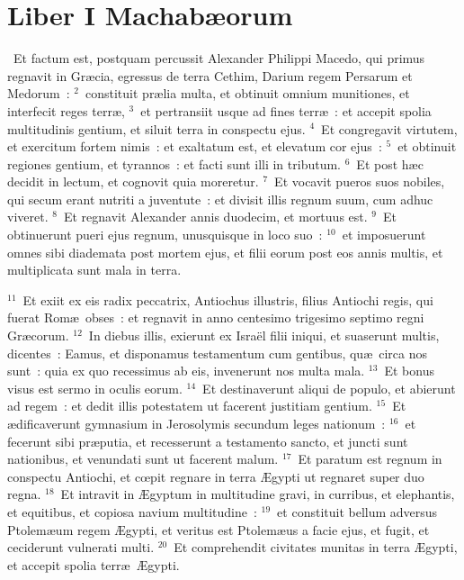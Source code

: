 {\centering \section*{Liber I Machabæorum}}\thispagestyle{empty}

~\lettrine[lines=10,image=true,loversize=0.05,lraise=-0.03]{E}{}t factum est, postquam percussit Alexander Philippi Macedo, qui primus regnavit in Gr\ae cia, egressus de terra Cethim, Darium regem Persarum et Medorum~:
${}^{2}$~constituit pr\ae lia multa, et obtinuit omnium munitiones, et interfecit reges terr\ae ,
${}^{3}$~et pertransiit usque ad fines terr\ae~: et accepit spolia multitudinis gentium, et siluit terra in conspectu ejus.
${}^{4}$~Et congregavit virtutem, et exercitum fortem nimis~: et exaltatum est, et elevatum cor ejus~:
${}^{5}$~et obtinuit regiones gentium, et tyrannos~: et facti sunt illi in tributum.
${}^{6}$~Et post h\ae c decidit in lectum, et cognovit quia moreretur.
${}^{7}$~Et vocavit pueros suos nobiles, qui secum erant nutriti a juventute~: et divisit illis regnum suum, cum adhuc viveret.
${}^{8}$~Et regnavit Alexander annis duodecim, et mortuus est.
${}^{9}$~Et obtinuerunt pueri ejus regnum, unusquisque in loco suo~:
${}^{10}$~et imposuerunt omnes sibi diademata post mortem ejus, et filii eorum post eos annis multis, et multiplicata sunt mala in terra.


${}^{11}$~Et exiit ex eis radix peccatrix, Antiochus illustris, filius Antiochi regis, qui fuerat Rom\ae\ obses~: et regnavit in anno centesimo trigesimo septimo regni Gr\ae corum.
${}^{12}$~In diebus illis, exierunt ex Isra\"el filii iniqui, et suaserunt multis, dicentes~: Eamus, et disponamus testamentum cum gentibus, qu\ae\ circa nos sunt~: quia ex quo recessimus ab eis, invenerunt nos multa mala.
${}^{13}$~Et bonus visus est sermo in oculis eorum.
${}^{14}$~Et destinaverunt aliqui de populo, et abierunt ad regem~: et dedit illis potestatem ut facerent justitiam gentium.
${}^{15}$~Et \ae dificaverunt gymnasium in Jerosolymis secundum leges nationum~:
${}^{16}$~et fecerunt sibi pr\ae putia, et recesserunt a testamento sancto, et juncti sunt nationibus, et venundati sunt ut facerent malum.
${}^{17}$~Et paratum est regnum in conspectu Antiochi, et cœpit regnare in terra \AE gypti ut regnaret super duo regna.
${}^{18}$~Et intravit in \AE gyptum in multitudine gravi, in curribus, et elephantis, et equitibus, et copiosa navium multitudine~:
${}^{19}$~et constituit bellum adversus Ptolem\ae um regem \AE gypti, et veritus est Ptolem\ae us a facie ejus, et fugit, et ceciderunt vulnerati multi.
${}^{20}$~Et comprehendit civitates munitas in terra \AE gypti, et accepit spolia terr\ae\ \AE gypti.



